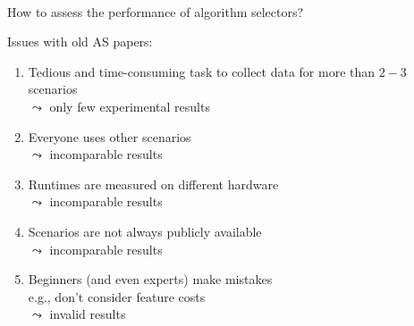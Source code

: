 \begin{frame}[c]{\flexfolio~}

\scalebox{0.57}{

}

\end{frame}
% 
% 
% 
\begin{frame}[c]{How to assess the performance of algorithm selectors?}

Issues with old AS papers:

\begin{enumerate}
  \item Tedious and time-consuming task to collect data for more than $2-3$ scenarios\\ $\leadsto$ only few experimental results
	\pause
  \medskip
  \item Everyone uses other scenarios\\ $\leadsto$ incomparable results
  \item Runtimes are measured on different hardware\\ $\leadsto$ incomparable results
  \pause
  \medskip
  \item Scenarios are not always publicly available\\ $\leadsto$ incomparable results
  \pause
  \medskip
  \item Beginners (and even experts) make mistakes\\ e.g., don't consider feature costs \\ $\leadsto$ invalid results
\end{enumerate}
\end{frame}
